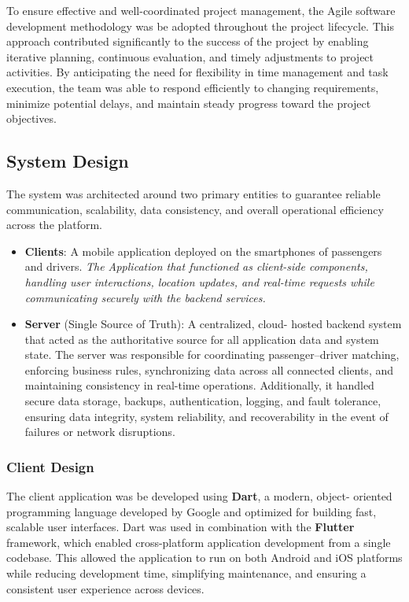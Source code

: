 To ensure effective and well-coordinated project management, the Agile software
development methodology was be adopted throughout the project lifecycle. This
approach contributed significantly to the success of the project by enabling
iterative planning, continuous evaluation, and timely adjustments to project
activities. By anticipating the need for flexibility in time management and task
execution, the team was able to respond efficiently to changing requirements,
minimize potential delays, and maintain steady progress toward the project
objectives.


\subsection{System Design}
The system was architected around two primary entities to guarantee reliable
communication, scalability, data consistency, and overall operational efficiency
across the platform.


\begin{itemize}
 \item \textbf{Clients}: A mobile application deployed on the smartphones
        of passengers and drivers.
    \textit{The Application that functioned as client-side components, handling user interactions, location updates, and real-time requests while communicating securely with the backend services.}

 \item \textbf{Server} (Single Source of Truth): A centralized, cloud-
        hosted backend system that acted as the authoritative source for all
        application data and system state. The server was responsible for
        coordinating passenger–driver matching, enforcing business rules,
        synchronizing data across all connected clients, and maintaining
        consistency in real-time operations. Additionally, it handled secure
        data storage, backups, authentication, logging, and fault tolerance,
        ensuring data integrity, system reliability, and recoverability in the
        event of failures or network disruptions.
\end{itemize}

\subsubsection{Client Design}

The client application was be developed using \textbf{Dart}, a modern, object-
oriented programming language developed by Google and optimized for building
fast, scalable user interfaces. Dart was used in combination with the
\textbf{Flutter} framework, which enabled cross-platform application development
from a single codebase. This allowed the application to run on both Android and
iOS platforms while reducing development time, simplifying maintenance, and
ensuring a consistent user experience across devices.


